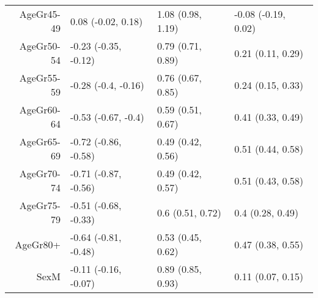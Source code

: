 \begin{table}[ht]
\begin{tabular}{rlll}
  AgeGr45-49 & 0.08 (-0.02, 0.18) & 1.08 (0.98, 1.19) & -0.08 (-0.19, 0.02) \\ 
  AgeGr50-54 & -0.23 (-0.35, -0.12) & 0.79 (0.71, 0.89) & 0.21 (0.11, 0.29) \\ 
  AgeGr55-59 & -0.28 (-0.4, -0.16) & 0.76 (0.67, 0.85) & 0.24 (0.15, 0.33) \\ 
  AgeGr60-64 & -0.53 (-0.67, -0.4) & 0.59 (0.51, 0.67) & 0.41 (0.33, 0.49) \\ 
  AgeGr65-69 & -0.72 (-0.86, -0.58) & 0.49 (0.42, 0.56) & 0.51 (0.44, 0.58) \\ 
  AgeGr70-74 & -0.71 (-0.87, -0.56) & 0.49 (0.42, 0.57) & 0.51 (0.43, 0.58) \\ 
  AgeGr75-79 & -0.51 (-0.68, -0.33) & 0.6 (0.51, 0.72) & 0.4 (0.28, 0.49) \\ 
  AgeGr80+ & -0.64 (-0.81, -0.48) & 0.53 (0.45, 0.62) & 0.47 (0.38, 0.55) \\ 
  SexM & -0.11 (-0.16, -0.07) & 0.89 (0.85, 0.93) & 0.11 (0.07, 0.15) \\ 
   \hline
\end{tabular}
\end{table}
